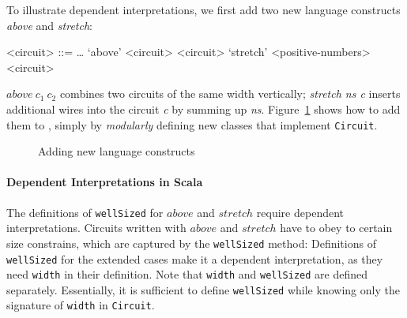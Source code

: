 
To illustrate dependent interpretations, we first add two new language 
constructs \emph{above} and \emph{stretch}:
\setlength{\grammarindent}{5em} %
\begin{grammar}
<circuit> ::= \ldots
\alt `above' <circuit> <circuit>
\alt `stretch' <positive-numbers> <circuit>
\end{grammar}
$above\ c_1\ c_2$ combines two circuits of the same width vertically;
\emph{stretch ns c} inserts additional wires into the circuit \emph{c} by
summing up \emph{ns}.
Figure~\ref{code:variant} shows how to add them to \dsl, simply by
\emph{modularly} defining new classes that implement \lstinline{Circuit}.
\begin{figure}
\caption{Adding new language constructs}
\label{code:variant}
\end{figure}

\paragraph{Dependent Interpretations in Scala}
The definitions of \lstinline{wellSized} for $above$ and $stretch$
require dependent interpretations.
Circuits written with $above$ and $stretch$ have to obey to certain
size constrains, which are captured by the \lstinline{wellSized} method:
Definitions of \lstinline{wellSized} for the extended cases make it a dependent
interpretation, as they need \lstinline{width} in their definition.
Note that \lstinline{width} and \lstinline{wellSized} are defined separately.
Essentially, it is sufficient to define \lstinline{wellSized} while
knowing only the signature of \lstinline{width} in \lstinline{Circuit}.

